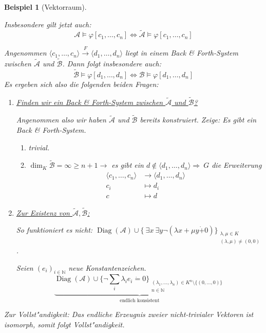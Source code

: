 \documentclass[a4paper,12pt,numbers=noenddot,parskip=full]{scrartcl}
\newcommand{\setN}{\mathbb{N}}
\newcommand{\Exists}{~\exists}
\newcommand{\scrA}{\mathcal{A}}
\newcommand{\scrB}{\mathcal{B}}
\DeclareMathOperator{\Diag}{Diag}
\newcommand{\vdig}{\Diag}
\theoremstyle{dotless}
\newtheorem{example}[theorem]{Beispiel}
\begin{document}
\begin{example}[Vektorraum]
\begin{enumerate}
		Insbesondere gilt jetzt auch: 
		\begin{equation*}
			\scrA \models \varphi[c_1, \dots, c_n] \Leftrightarrow \tilde{\scrA} \models \varphi[c_1, \dots, c_n]
		\end{equation*}
		
		Angenommen $\langle c_1, \dots, c_n \rangle \overset{F}{\longrightarrow} \langle d_1, \dots, d_n \rangle$ liegt in einem Back \& Forth-System zwischen $\tilde{\scrA}$ und $\tilde{\scrB}$. Dann folgt insbesondere auch:
		\begin{equation*}
			\tilde{\scrB} \models \varphi[d_1, \dots, d_n] \Leftrightarrow \scrB \models \varphi[d_1, \dots, d_n]
		\end{equation*}
		Es ergeben sich also die folgenden beiden Fragen:
		\begin{enumerate}
			\item \underline{Finden wir ein Back \& Forth-System zwischen $\tilde{\scrA}$ und $\tilde{\scrB}$?} 
			
			Angenommen also wir haben $\tilde{\scrA}$ und $\tilde{\scrB}$ bereits konstruiert. Zeige: Es gibt ein Back \& Forth-System.
			\begin{enumerate}
				\item[$c \in$ UR:] trivial.
				\item[$c \notin$ UR:] $\dim_K \tilde{\scrB} = \infty \geq n+1 \longrightarrow$ es gibt ein $d \notin \langle d_1, \dots, d_n \rangle \Rightarrow~G$ die Erweiterung \begin{align*}
					\langle c_1, \dots, c_n \rangle &\longrightarrow \langle d_1, \dots, d_n \rangle\\c_i &\longmapsto d_i\\c &\longmapsto d
				\end{align*}
			\end{enumerate}
		
			\item \underline{Zur Existenz von $\tilde{\scrA}, \tilde{\scrB}$:}
			
			So funktioniert es nicht: $\vdig(\scrA) \cup \{\Exists x \Exists y \lnot (\lambda x + \mu y \dot{+} 0)\}_{\substack{\lambda, \mu \in K\\(\lambda, \mu) \neq (0,0)}}$.
			
			Seien $(e_i)_{i \in \setN}$ neue Konstantenzeichen.
			\begin{equation*}
				\underbrace{\vdig(\scrA) \cup \{\lnot \sum_i \lambda_i e_i \dot=0\}_{\substack{(\lambda_1, \dots, \lambda_n) \in K^n \setminus \{(0, \dots, 0) \}\\n \in \setN}}}_\text{endlich konsistent}
			\end{equation*}
		\end{enumerate}
		Zur Vollst"andigkeit: Das endliche Erzeugnis zweier nicht-trivialer Vektoren ist isomorph, somit folgt Vollst"andigkeit.
	\end{enumerate}
\end{example}
\end{document}
